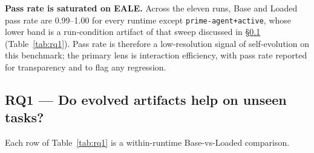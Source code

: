 \documentclass{article}
\begin{document}
\textbf{Pass rate is saturated on EALE.} Across the eleven runs, Base and Loaded pass rate are 0.99--1.00 for every runtime except \texttt{prime-agent+active}, whose lower band is a run-condition artifact of that sweep discussed in \S\ref{sec:rq1} (Table~\ref{tab:rq1}). Pass rate is therefore a low-resolution signal of self-evolution on this benchmark; the primary lens is interaction efficiency, with pass rate reported for transparency and to flag any regression.

\subsection{RQ1 --- Do evolved artifacts help on unseen tasks?}
\label{sec:rq1}

Each row of Table~\ref{tab:rq1} is a within-runtime Base-vs-Loaded comparison.
\end{document}
